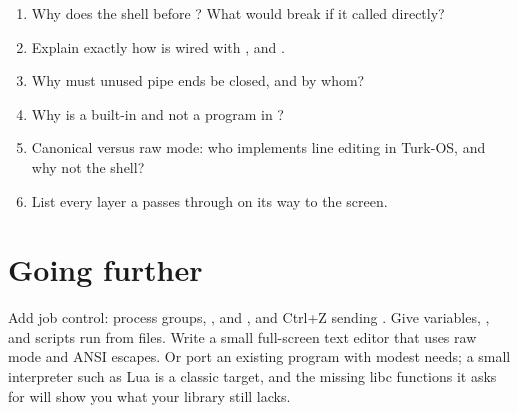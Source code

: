 \documentclass[11pt,a4paper]{article}
\begin{document}
\begin{questionbox}
\begin{enumerate}
  \item Why does the shell  before ? What would break if it called  directly?
  \item Explain exactly how  is wired with ,  and .
  \item Why must unused pipe ends be closed, and by whom?
  \item Why is  a built-in and not a program in ?
  \item Canonical versus raw mode: who implements line editing in Turk-OS, and why not the shell?
  \item List every layer a  passes through on its way to the screen.
\end{enumerate}
\end{questionbox}

\section{Going further}

Add job control: process groups, ,  and , and Ctrl+Z sending . Give
 variables, ,  and scripts run from files. Write a small full-screen text editor that uses
raw mode and ANSI escapes. Or port an existing program with modest needs; a small interpreter such as Lua is a
classic target, and the missing libc functions it asks for will show you what your library still lacks.

\booklegend
\end{document}
